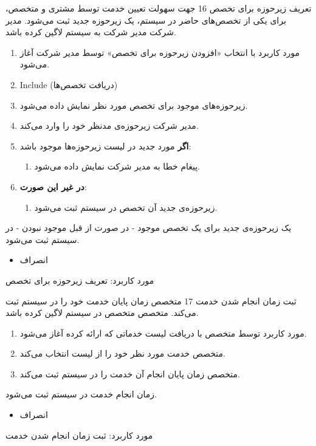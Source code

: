 \usecase
{تعریف زیرحوزه برای تخصص}
{16}
{جهت سهولت تعیین خدمت توسط مشتری و متخصص، برای یکی از تخصص‌های حاضر در سیستم، یک زیرحوزه جدید ثبت می‌شود.}
{مدیر شرکت}
{}
{مدیر شرکت به سیستم لاگین کرده باشد.}
{
	\vspace*{-0.6cm}
	\begin{enumerate}
		\item 
		مورد کاربرد با انتخاب «افزودن زیرحوزه برای تخصص» توسط مدیر شرکت آغاز می‌شود.
		\item Include (دریافت تخصص‌ها)
		\item زیرحوزه‌های موجود برای تخصص مورد نظر نمایش داده می‌شود.
		\item مدیر شرکت زیرحوزه‌ی مدنظر خود را وارد می‌کند. 
		\item
		\textbf{اگر}
		مورد جدید در لیست زیرحوزه‌ها موجود باشد:
		\begin{enumerate}[label=\theenumi.\arabic*.]
			\item پیغام خطا به مدیر شرکت نمایش داده می‌شود.
		\end{enumerate}
		\item
		\textbf{در غیر این صورت}:
		\begin{enumerate}[label=\theenumi.\arabic*.]
			\item زیرحوزه‌ی جدید آن تخصص در سیستم ثبت می‌شود.
		\end{enumerate}		
	\end{enumerate}
}
{یک زیرحوزه‌ی جدید برای یک تخصص موجود - در صورت از قبل موجود نبودن - در سیستم ثبت می‌شود.}
{
	\begin{itemize}
		\vspace*{-0.6cm}
		\item انصراف
	\end{itemize}
}
{
	مورد کاربرد: تعریف زیرحوزه برای تخصص
}


\usecase
{ثبت زمان انجام شدن خدمت}
{17}
{متخصص زمان پایان خدمت خود را در سیستم ثبت می‌کند.}
{متخصص}
{}
{متخصص در سیستم لاگین کرده باشد.}
{
	\vspace*{-0.6cm}
	\begin{enumerate}
		\item مورد کاربرد توسط متخصص با دریافت لیست خدماتی که ارائه کرده آغاز می‌شود.
		\item متخصص خدمت مورد نظر خود را از لیست انتخاب می‌کند.
		\item متخصص زمان پایان انجام آن خدمت را در سیستم ثبت می‌کند.
	\end{enumerate}
}
{زمان انجام خدمت در سیستم ثبت می‌شود.}
{
	\begin{itemize}
		\vspace*{-0.6cm}
		\item انصراف
	\end{itemize}
}
{
	مورد کاربرد: ثبت زمان انجام شدن خدمت
}

